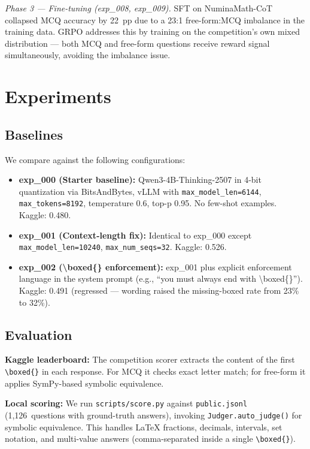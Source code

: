 \documentclass{article}
\begin{document}
\emph{Phase 3 --- Fine-tuning (exp\_008, exp\_009).} SFT on NuminaMath-CoT collapsed MCQ accuracy by 22~pp due to a 23:1 free-form:MCQ imbalance in the training data. GRPO addresses this by training on the competition's own mixed distribution --- both MCQ and free-form questions receive reward signal simultaneously, avoiding the imbalance issue.


\section{Experiments}
\label{sec:experiments}

\subsection{Baselines}
\label{sec:baselines}
We compare against the following configurations:
\begin{itemize}
  \item \textbf{exp\_000 (Starter baseline):} Qwen3-4B-Thinking-2507 in 4-bit quantization via BitsAndBytes, vLLM with \texttt{max\_model\_len=6144}, \texttt{max\_tokens=8192}, temperature 0.6, top-p 0.95. No few-shot examples. Kaggle: 0.480.
  \item \textbf{exp\_001 (Context-length fix):} Identical to exp\_000 except \texttt{max\_model\_len=10240}, \texttt{max\_num\_seqs=32}. Kaggle: 0.526.
  \item \textbf{exp\_002 (\textbackslash{}boxed\{\} enforcement):} exp\_001 plus explicit enforcement language in the system prompt (e.g., ``you must always end with \textbackslash{}boxed\{\}''). Kaggle: 0.491 (regressed --- wording raised the missing-boxed rate from 23\% to 32\%).
\end{itemize}

\subsection{Evaluation}
\label{sec:evaluation}
\textbf{Kaggle leaderboard:} The competition scorer extracts the content of the first \verb|\boxed{}| in each response. For MCQ it checks exact letter match; for free-form it applies SymPy-based symbolic equivalence.

\textbf{Local scoring:} We run \texttt{scripts/score.py} against \texttt{public.jsonl} (1,126~questions with ground-truth answers), invoking \texttt{Judger.auto\_judge()} for symbolic equivalence. This handles LaTeX fractions, decimals, intervals, set notation, and multi-value answers (comma-separated inside a single \verb|\boxed{}|).
\end{document}
